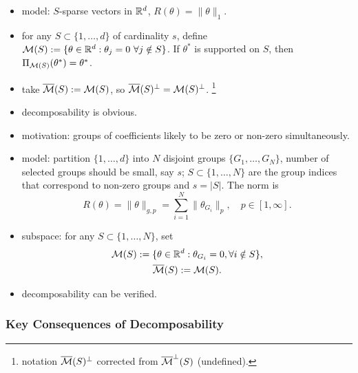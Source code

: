 \begin{ex} \leavevmode
\begin{itemize}
    \item model: $S$-sparse vectors in ${\mathbb{R}}^d$, $R(\theta)=\|\theta\|_1$.
    \item for any $S\subset\{1,\dots,d\}$ of cardinality $s$,
        define $\cM(S):=\{\theta\in\real^d:\theta_j=0\ \forall j \notin S \}$.
        If $\theta^*$ is supported on $S$,
        then $\Pi_{\mathcal{M}(S)}(\theta^*)=\theta^*$.
    \item take ${\overline{\mathcal{M}}}(S):=\mathcal{M}(S)$,
        so ${\overline{\mathcal{M}}}(S)^\perp = \mathcal{M}(S)^\perp$.
        \footnote{notation ${\overline{\mathcal{M}}}(S)^\perp$ corrected from ${\overline{\mathcal{M}}}^\perp(S)$ (undefined).}
    \item decomposability is obvious.
\end{itemize}
\end{ex}

\begin{ex} \leavevmode
\begin{itemize}
    \item motivation: groups of coefficients likely to be
        zero or non-zero simultaneously.
    \item model: partition $\{1,\dots,d\}$ into $N$ disjoint groups
        $\{G_1,\dots,G_N\}$, number of selected groups should be small,
        say $s$; \ie $S\subset \{1,\dots,N\}$
        are the group indices that correspond to non-zero groups and $s=|S|$.
        The norm is
        \begin{equation}
            R(\theta) = \|\theta\|_{g,p} = \sum_{i=1}^N\|\theta_{G_i}\|_p,\quad p \in[1,\infty].
        \end{equation}
    \item subspace: for any $S\subset\{1,\dots,N\}$, set
        \begin{gather}
            \mathcal{M}(S) := \{\theta\in{\mathbb{R}}^d:\theta_{G_i}=0, \forall i\notin S\}, \\
            {\overline{\mathcal{M}}}(S) := \mathcal{M}(S).
        \end{gather}
    \item decomposability can be verified.
\end{itemize}
\end{ex}

\subsubsection{Key Consequences of Decomposability}

